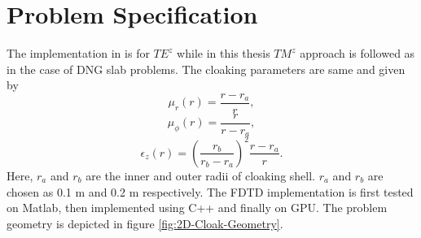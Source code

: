 \section{Problem Specification}
The implementation in \cite{Radial-Zhao} is for $TE^z$ while in this thesis $TM^z$ approach is followed as in the case of DNG slab problems. The cloaking parameters are same and given by
\begin{equation}
\mu_r(r)=\dfrac{r-r_a}{r},
\label{mu-r}
\end{equation}
\begin{equation}
\mu_{\phi}(r)=\dfrac{r}{r-r_a},
\label{mu-phi}
\end{equation}
\begin{equation}
\epsilon_z(r)=\left(\dfrac{r_b}{r_b-r_a}\right)^2\dfrac{r-r_a}{r}.
\label{epsilon-z}
\end{equation}
Here, $r_a$ and $r_b$ are the inner and outer radii of cloaking shell. $r_a$ and $r_b$ are chosen as 0.1 m and 0.2 m respectively. The FDTD implementation is first tested on Matlab, then implemented using C++ and finally on GPU. The problem geometry is depicted in figure \ref{fig:2D-Cloak-Geometry}.
